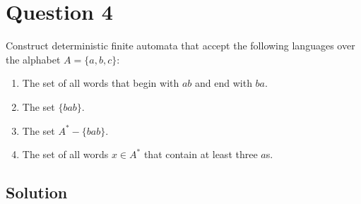
\section*{Question 4}

Construct deterministic finite automata that accept the following languages over the alphabet $A = \{a,b,c\}$:
\begin{enumerate}[label=(\alph*)]
	\item The set of all words that begin with $ab$ and end with $ba$.
	\item The set $\{bab\}$.
	\item The set $A^* - \{bab\}$.
	\item The set of all words $x \in A^*$ that contain at least three $a$s.
\end{enumerate}

\subsection*{Solution}

